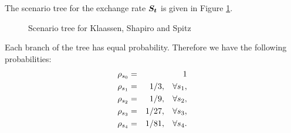 The scenario tree for the exchange rate $\mathbf{\boldsymbol{S_{t}}}$ is given in Figure \ref{HEDGE:tree}.
\begin{figure}[ht]
\caption{Scenario tree for Klaassen, Shapiro and Spitz \cite{klaassen90}}
\label{HEDGE:tree}

\end{figure}
Each branch of the tree has equal probability.  Therefore we have the following probabilities:
\begin{eqnarray*}
\rho_{s_0} &=& 1\\
\rho_{s_1} &=& 1/3, \hspace{3mm} \forall s_1,\\
\rho_{s_2} &=& 1/9, \hspace{3mm} \forall s_2,\\
\rho_{s_3} &=& 1/27, \hspace{3mm} \forall s_3,\\
\rho_{s_4} &=& 1/81, \hspace{3mm} \forall s_4.
\end{eqnarray*}

